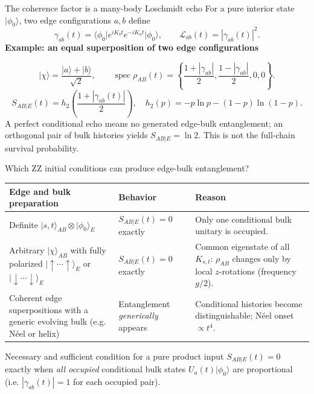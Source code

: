 \documentclass[aspectratio=169,10pt]{beamer}
\newcommand{\ket}[1]{\lvert #1\rangle}
\newcommand{\bra}[1]{\langle #1\rvert}
\newcommand{\sechead}[1]{{\color{sea}\bfseries #1}\par\vspace{1mm}}
\newcommand{\noteinline}[1]{{\color{muted}\footnotesize #1}}
\begin{document}
\begin{frame}{The coherence factor is a many-body Loschmidt echo}
For a pure interior state \(\ket{\phi_0}\), two edge configurations \(a,b\) define
\[
\gamma_{ab}(t)=\bra{\phi_0}e^{iK_bt}e^{-iK_at}\ket{\phi_0},
\qquad \mathcal L_{ab}(t)=|\gamma_{ab}(t)|^2.
\]
\sechead{Example: an equal superposition of two edge configurations}
\[
\ket{\chi}=\frac{\ket a+\ket b}{\sqrt2},\qquad
\operatorname{spec}\rho_{AB}(t)=\left\{\frac{1+|\gamma_{ab}|}{2},\frac{1-|\gamma_{ab}|}{2},0,0\right\}.
\]
\[
\boxed{S_{AB|E}(t)=h_2\!\left(\frac{1+|\gamma_{ab}(t)|}{2}\right),\quad
h_2(p)=-p\ln p-(1-p)\ln(1-p).}
\]
\vspace{.07cm}
\noteinline{A perfect conditional echo means no generated edge-bulk entanglement; an orthogonal pair of bulk histories yields \(S_{AB|E}=\ln2\). This is not the full-chain survival probability.}
\end{frame}


\begin{frame}{Which ZZ initial conditions can produce edge-bulk entanglement?}
\renewcommand{\arraystretch}{1.2}
{\small
\begin{tabular}{@{}p{5.0cm}p{2.75cm}p{5.3cm}@{}}
\toprule
\textbf{Edge and bulk preparation} & \textbf{Behavior} & \textbf{Reason}\\
\midrule
Definite \(\ket{s,t}_{AB}\otimes\ket{\phi_0}_E\) & \(S_{AB|E}(t)=0\) exactly & Only one conditional bulk unitary is occupied.\\
Arbitrary \(\ket{\chi}_{AB}\) with fully polarized \(\ket{\uparrow\cdots\uparrow}_E\) or \(\ket{\downarrow\cdots\downarrow}_E\) & \(S_{AB|E}(t)=0\) exactly & Common eigenstate of all \(K_{s,t}\): \(\rho_{AB}\) changes only by local \(z\)-rotations (frequency \(g/2\)).\\
Coherent edge superpositions with a generic evolving bulk (e.g. N\'eel or helix) & Entanglement \emph{generically} appears & Conditional histories become distinguishable; N\'eel onset \(\propto t^4\).\\
\bottomrule
\end{tabular}
}
\vspace{.12cm}
\begin{block}{Necessary and sufficient condition for a pure product input}
\(S_{AB|E}(t)=0\) exactly when \emph{all occupied} conditional bulk states \(U_a(t)\ket{\phi_0}\) are proportional (i.e. \(|\gamma_{ab}(t)|=1\) for each occupied pair).
\end{block}
\end{frame}
\end{document}

